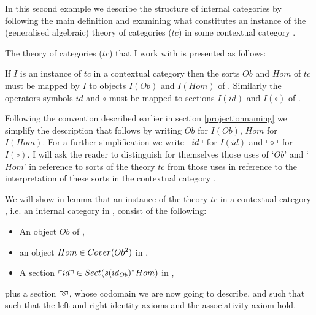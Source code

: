 In this second example we describe the structure of internal categories by following the main definition and examining
what constitutes an instance of the (generalised algebraic) theory of categories ($tc$) in some
 contextual category \catc.

The theory of categories ($tc$) that I work with is presented as follows:


\iffalse
\begin{gatrules}
\gatintros
\gatintroducing{Ob}
\isT{Ob} \\
\gatintroducing{Hom}
  \gatsingular{\ofT{x_1,x_2}{Ob}}{\isT{Hom(x_1,x_2)}} \\	
\gatintroducing{id}
  \gatsingular{\ofT{w}{Ob}}{\ofT{id(w)}{Hom(w,w)}} \\	
\gataxioms
\gatintroducing{  \gataxiomno{1} \\   \gataxiomno{2}}
\begin{gatgroup}{\ofT{f}{Hom(x_1,x_2)},\ \ofT{x_1,x_2}{Ob}}
    \gatleaf{}{id_{x_1} \circ f = f} \\
    \gatleaf{}{f \circ id_{x_2} = f}
\end{gatgroup} \\
\gatintroducing{ \gataxiomno{3} }
\gatsingular{\associativitypremisereversed}{(f \circ g) \circ h = f \circ (g \circ h)} 
\end{gatrules}
\fi

If $I$ is an instance of $tc$ in a contextual category \catcw then the sorts $Ob$ and $Hom$ of $tc$ 
must be mapped by $I$  to objects $I(Ob)$ and  $I(Hom)$ of \catc.
Similarly  the operators symbols
$id$ and $\circ$ must be mapped to sections $I(id)$ and $I(\circ)$ of \catc.

Following the convention described earlier in section \ref{projectionnaming} we simplify  
the description that follows by writing $Ob$ for $I(Ob)$, $Hom$ for $I(Hom)$.
For a further simplification we write $\left\ulcorner id\right\urcorner$ for $I(id)$ and   $\left\ulcorner\circ\right\urcorner$ for $I(\circ)$.   I will ask the reader  to distinguish for themselves 
those uses of `$Ob$' and `$Hom$' in reference to sorts of the theory $tc$ from those uses in reference to the interpretation of these sorts in the contextual category \catc. 

We will show in lemma  that an instance of the theory $tc$ in a contextual category \catcw, 
i.e. an internal category in \catcw, 
consist of the following:

\begin{itemize}
\item An object $Ob$ of \catc,
\item an object $Hom \in Cover(Ob^2)$ in \catc,
\item A section $\left\ulcorner id\right\urcorner \in Sect(s(id_{Ob})^*Hom)$ in \catc, 								
\end{itemize}
plus a section $\left\ulcorner\kern-2pt\circ \kern-2pt\right\urcorner$, whose codomain we are now going to describe, and such that
 such that the left and right identity axioms and the associativity axiom hold.

